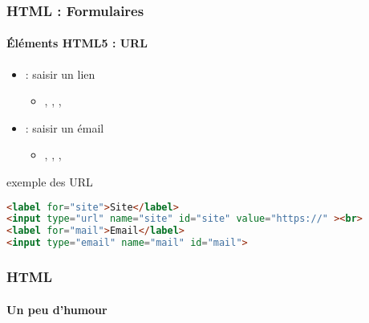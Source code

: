 \documentclass[xcolor=table]{beamer}
\begin{document}
\begin{frame}[fragile]
\frametitle{HTML : Formulaires}
\framesubtitle{Éléments HTML5 : URL}

\begin{itemize}
	\item {} :  saisir un lien
	\begin{itemize}
		\item {}, , , 
	\end{itemize}
	\item {} : saisir un émail
	\begin{itemize}
		\item {}, , , 
	\end{itemize}
\end{itemize}

\begin{exampleblock}{exemple des URL}
\lstset{escapeinside=**}
\scriptsize\bfseries\vspace{-6pt}
\begin{lstlisting}[language={html}]
<label for="site">Site</label>
<input type="url" name="site" id="site" value="https://" ><br>
<label for="mail">Email</label>
<input type="email" name="mail" id="mail">
\end{lstlisting}\vspace{-6pt}
\end{exampleblock}

\end{frame}

\begin{frame}
\frametitle{HTML}
\framesubtitle{Un peu d'humour}

\begin{center}
\end{center}

\end{frame}

\end{document}
